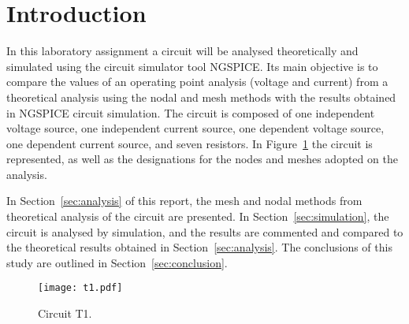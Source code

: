 \section{Introduction}
\label{sec:introduction}

In this laboratory assignment a circuit will be analysed theoretically and simulated using the circuit simulator tool NGSPICE. Its main objective is to compare the values of an operating point analysis (voltage and current) from a theoretical analysis using the nodal and mesh methods with the results obtained in NGSPICE circuit simulation.
The circuit is composed of one independent voltage source, one independent current source, one dependent voltage source, one dependent current source, and seven resistors.
In Figure~\ref{fig:t1} the circuit is represented, as well as the designations for the nodes and meshes adopted on the analysis. 

In Section~\ref{sec:analysis} of this report, the mesh and nodal methods from theoretical analysis of the circuit are
presented. In Section~\ref{sec:simulation}, the circuit is analysed by
simulation, and the results are commented and compared to the theoretical results obtained in
Section~\ref{sec:analysis}. The conclusions of this study are outlined in
Section~\ref{sec:conclusion}.

\begin{figure}[h] \centering
\texttt{[image: t1.pdf]}
\caption{Circuit T1.}
\label{fig:t1}
\end{figure}

